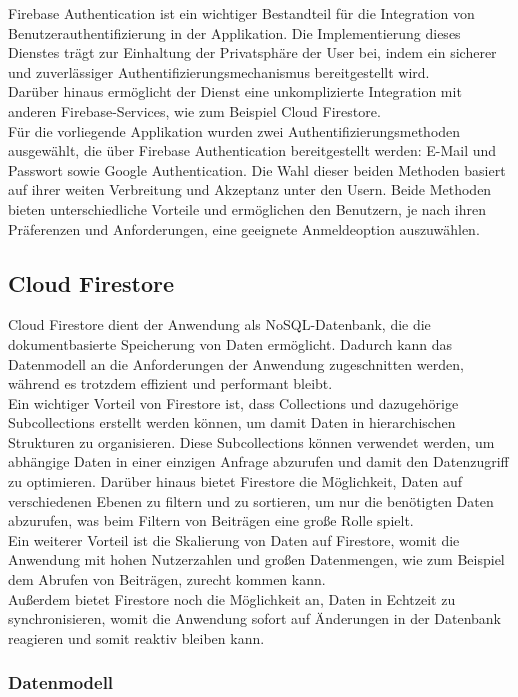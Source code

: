 Firebase Authentication ist ein wichtiger Bestandteil für die Integration von Benutzerauthentifizierung in der Applikation. Die Implementierung dieses Dienstes trägt zur Einhaltung der Privatsphäre der User bei, indem ein sicherer und zuverlässiger Authentifizierungsmechanismus bereitgestellt wird.
\\
Darüber hinaus ermöglicht der Dienst eine unkomplizierte Integration mit anderen Firebase-Services, wie zum Beispiel Cloud Firestore.
\\
Für die vorliegende Applikation wurden zwei Authentifizierungsmethoden ausgewählt, die über Firebase Authentication bereitgestellt werden: E-Mail und Passwort sowie Google Authentication. Die Wahl dieser beiden Methoden basiert auf ihrer weiten Verbreitung und Akzeptanz unter den Usern. Beide Methoden bieten unterschiedliche Vorteile und ermöglichen den Benutzern, je nach ihren Präferenzen und Anforderungen, eine geeignete Anmeldeoption auszuwählen.


\subsection{Cloud Firestore}
Cloud Firestore dient der Anwendung als NoSQL-Datenbank, die die dokumentbasierte Speicherung von Daten ermöglicht. Dadurch kann das Datenmodell an die Anforderungen der Anwendung zugeschnitten werden, während es trotzdem effizient und performant bleibt.
\\
Ein wichtiger Vorteil von Firestore ist, dass Collections und dazugehörige Subcollections erstellt werden können, um damit Daten in hierarchischen Strukturen zu organisieren. Diese Subcollections können verwendet werden, um abhängige Daten in einer einzigen Anfrage abzurufen und damit den Datenzugriff zu optimieren. Darüber hinaus bietet Firestore die Möglichkeit, Daten auf verschiedenen Ebenen zu filtern und zu sortieren, um nur die benötigten Daten abzurufen, was beim Filtern von Beiträgen eine große Rolle spielt.
\\
Ein weiterer Vorteil ist die Skalierung von Daten auf Firestore, womit die Anwendung mit hohen Nutzerzahlen und großen Datenmengen, wie zum Beispiel dem Abrufen von Beiträgen, zurecht kommen kann.
\\
Außerdem bietet Firestore noch die Möglichkeit an, Daten in Echtzeit zu synchronisieren, womit die Anwendung sofort auf Änderungen in der Datenbank reagieren und somit reaktiv bleiben kann.


\subsubsection{Datenmodell}

